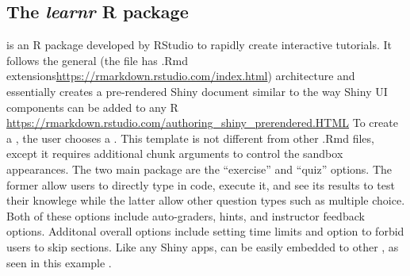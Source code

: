 \hypertarget{the-learnr-r-package}{%
\subsection{\texorpdfstring{The \emph{learnr} R
package}{The learnr R package}}\label{the-learnr-r-package}}

\DIFdelbegin \emph{} %
\DIFdelend \DIFaddbegin {} \DIFaddend \citep{learnr} is an R package developed by RStudio to
rapidly create interactive tutorials. It follows the general \emph{\DIFdelbegin {}\DIFdelend \DIFaddbegin {}\DIFaddend } (the file has .Rmd extensions\DIFaddbegin \DIFadd{,
}\url{https://rmarkdown.rstudio.com/index.html}\DIFaddend ) architecture and
essentially creates a pre-rendered Shiny document similar to the way
Shiny UI components can be added to any R \DIFdelbegin {}\DIFdelend \DIFaddbegin {}\url{https://rmarkdown.rstudio.com/authoring_shiny_prerendered.HTML} \DIFaddend To create a
\DIFdelbegin \emph{} %
\DIFdelend \DIFaddbegin {}  \DIFaddend , the user chooses a \DIFdelbegin \emph{} %
\DIFdelend \DIFaddbegin {} \DIFaddend . This
template is not different from other .Rmd files, except it requires
additional chunk arguments to control the sandbox appearances. The two
main \DIFdelbegin {}\emph{} %
\DIFdelend \DIFaddbegin {} \DIFaddend package are the ``exercise'' and
``quiz'' options. The former allow users to directly type in code,
execute it, and see its results to test their knowlege while the latter
allow other question types such as multiple choice. Both of these
options include auto-graders, hints, and instructor feedback options.
Additonal overall options include setting time limits and \DIFaddbegin {}\DIFaddend option to
forbid users to skip sections. Like any Shiny apps, \DIFdelbegin \emph{} %
\DIFdelend \DIFaddbegin {}
\DIFaddend can be easily embedded to other \DIFdelbegin {}\DIFdelend \DIFaddbegin {}\DIFaddend , as seen in this example
\citep{rmrwr}.

